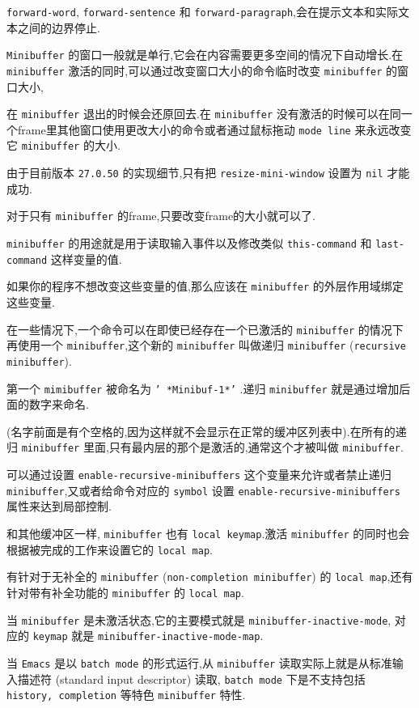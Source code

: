 \documentclass[11pt]{article}
\begin{document}
\texttt{forward-word}, \texttt{forward-sentence} 和 \texttt{forward-paragraph},会在提示文本和实际文本之间的边界停止.

\texttt{Minibuffer} 的窗口一般就是单行,它会在内容需要更多空间的情况下自动增长.在 \texttt{minibuffer} 激活的同时,可以通过改变窗口大小的命令临时改变 \texttt{minibuffer} 的窗口大小,

在 \texttt{minibuffer} 退出的时候会还原回去.在 \texttt{minibuffer} 没有激活的时候可以在同一个frame里其他窗口使用更改大小的命令或者通过鼠标拖动 \texttt{mode line} 来永远改变它 \texttt{minibuffer} 的大小.

由于目前版本 \texttt{27.0.50} 的实现细节,只有把 \texttt{resize-mini-window} 设置为 \texttt{nil} 才能成功.

对于只有 \texttt{minibuffer} 的frame,只要改变frame的大小就可以了.

\texttt{minibuffer} 的用途就是用于读取输入事件以及修改类似 \texttt{this-command} 和 \texttt{last-command} 这样变量的值.

如果你的程序不想改变这些变量的值,那么应该在 \texttt{minibuffer} 的外层作用域绑定这些变量.

在一些情况下,一个命令可以在即使已经存在一个已激活的 \texttt{minibuffer} 的情况下再使用一个 \texttt{minibuffer},这个新的 \texttt{minibuffer} 叫做递归 \texttt{minibuffer} (\texttt{recursive minibuffer}).

第一个 \texttt{mimibuffer} 被命名为 \texttt{' *Minibuf-1*'} .递归 \texttt{minibuffer} 就是通过增加后面的数字来命名.

(名字前面是有个空格的,因为这样就不会显示在正常的缓冲区列表中).在所有的递归 \texttt{minibuffer} 里面,只有最内层的那个是激活的,通常这个才被叫做 \texttt{minibuffer}.

可以通过设置 \texttt{enable-recursive-minibuffers} 这个变量来允许或者禁止递归 \texttt{minibuffer},又或者给命令对应的 \texttt{symbol} 设置 \texttt{enable-recursive-minibuffers} 属性来达到局部控制.

和其他缓冲区一样, \texttt{minibuffer} 也有 \texttt{local keymap}.激活 \texttt{minibuffer} 的同时也会根据被完成的工作来设置它的 \texttt{local map}.

有针对于无补全的 \texttt{minibuffer} (\texttt{non-completion minibuffer}) 的 \texttt{local map},还有针对带有补全功能的 \texttt{minibuffer} 的 \texttt{local map}.

当 \texttt{minibuffer} 是未激活状态,它的主要模式就是 \texttt{minibuffer-inactive-mode}, 对应的 \texttt{keymap} 就是 \texttt{minibuffer-inactive-mode-map}.

当 \texttt{Emacs} 是以 \texttt{batch mode} 的形式运行,从 \texttt{minibuffer} 读取实际上就是从标准输入描述符 (standard input descriptor) 读取, \texttt{batch mode} 下是不支持包括 \texttt{history, completion} 等特色 \texttt{minibuffer} 特性.
\end{document}
